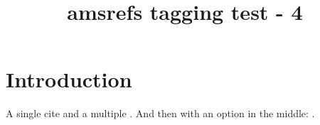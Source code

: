 \documentclass{article}
\title{amsrefs tagging test - 4}
\begin{document}
\section{Introduction}

A single cite \cite{MR1451594}
and a multiple \cites{Weyl,Gould,Rob,MR95f:17013,Ser77}.
And then with an option in the middle:
.

\begin{bibsection}
\begin{biblist}
\end{biblist}
\end{bibsection}
\end{document}
